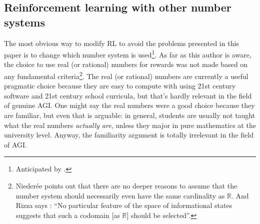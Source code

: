 \documentclass[reqno]{article}
\theoremstyle{definition}
\begin{document}

\subsection{Reinforcement learning with other number systems}

The most obvious way to modify RL to avoid the problems presented in this
paper is to change which number system is used\footnote{Anticipated
by \cite{rizza2016divergent}.}.
As far as this author is aware,
the choice to use real (or rational) numbers for rewards was not made based
on any fundamental criteria\footnote{Nieder{\'e}e points out
\cite{niederee1992numbers} that there are
no deeper reasons to assume that the number system should necessarily
even have the same cardinality as $\mathbb R$. And Rizza says
\cite{rizza2016divergent}: ``No particular feature of the space of informational
states suggests that such a codomain [as $\mathbb R$] should be selected''.}. The real
(or rational) numbers are currently a
useful pragmatic choice because they are easy to compute with using 21st
century software and 21st century school curricula, but that's hardly relevant
in the field of genuine AGI. One might
say the real numbers were a good choice because they are familiar, but even
that is arguable: in general, students are usually not taught what the
real numbers \emph{actually are},
unless they major in pure mathematics at the university level. Anyway,
the familiarity argument is totally irrelevant in the field of AGI.
\end{document}

